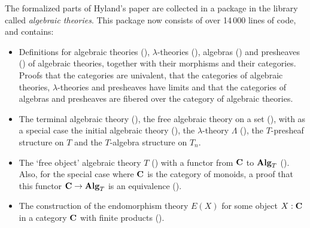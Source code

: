 The formalized parts of Hyland's paper are collected in a package in the library called \textit{algebraic theories}. This package now consists of over 14\,000 lines of code, and contains:
\begin{itemize}
  \item Definitions for algebraic theories (), $ \lambda $-theories (), algebras () and presheaves () of algebraic theories, together with their morphisms and their categories. Proofs that the categories are univalent, that the categories of algebraic theories, $ \lambda $-theories and presheaves have limits and that the categories of algebras and presheaves are fibered over the category of algebraic theories.
  \item The terminal algebraic theory (), the free algebraic theory on a set (), with as a special case the initial algebraic theory (), the $ \lambda $-theory $ \Lambda $ (), the $ T $-presheaf structure on $ T $ and the $ T $-algebra structure on $ T_n $.
  \item The `free object' algebraic theory $ T $ () with a functor from $ \mathbf{C} $ to $ \mathbf{Alg}_{T} $ (). Also, for the special case where $ \mathbf{C} $ is the category of monoids, a proof that this functor $ \mathbf{C} \to \mathbf{Alg}_{T} $ is an equivalence ().
  \item The construction of the endomorphism theory $ E(X) $ for some object $ X : \mathbf{C} $ in a category $ \mathbf{C} $ with finite products ().

\end{itemize}
